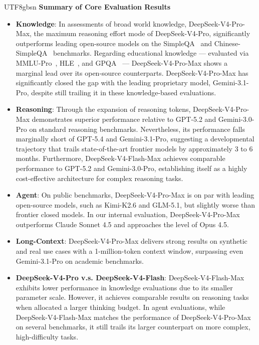 \documentclass[11pt, a4paper, logo, copyright, nonumbering]{deepseek}
\newcommand{\dsvivp}{DeepSeek-V4-Pro}
\newcommand{\dsvivpm}{DeepSeek-V4-Pro-Max}
\newcommand{\dsvivf}{DeepSeek-V4-Flash}
\newcommand{\dsvivfm}{DeepSeek-V4-Flash-Max}
\begin{document}
\begin{CJK*}{UTF8}{gbsn}
\noindent
\textbf{Summary of Core Evaluation Results}
\begin{itemize}[topsep=0pt]
    \item \textbf{Knowledge}:
    In assessments of broad world knowledge, \dsvivpm{}, the maximum reasoning effort mode of \dsvivp{}, significantly outperforms leading open-source models on the SimpleQA~\citep{simpleqa} and Chinese-SimpleQA~\citep{csimpleqa} benchmarks. 
    Regarding educational knowledge --- evaluated via MMLU-Pro~\citep{mmlu_pro}, HLE~\citep{hle}, and GPQA~\citep{gpqa} --- \dsvivpm{} shows a marginal lead over its open-source counterparts. 
    \dsvivpm{} has significantly closed the gap with the leading proprietary model, Gemini-3.1-Pro, despite still trailing it in these knowledge-based evaluations.
    
    \item \textbf{Reasoning}: 
    Through the expansion of reasoning tokens, \dsvivpm{} demonstrates superior performance relative to GPT-5.2 and Gemini-3.0-Pro on standard reasoning benchmarks. 
    Nevertheless, its performance falls marginally short of GPT-5.4 and Gemini-3.1-Pro, suggesting a developmental trajectory that trails state-of-the-art frontier models by approximately 3 to 6 months.
    Furthermore, \dsvivfm{} achieves comparable performance to GPT-5.2 and Gemini-3.0-Pro, establishing itself as a highly cost-effective architecture for complex reasoning tasks.

    \item \textbf{Agent}: 
    On public benchmarks, \dsvivpm{} is on par with leading open-source models, such as Kimi-K2.6 and GLM-5.1, but slightly worse than frontier closed models. 
    In our internal evaluation, \dsvivpm{} outperforms Claude Sonnet 4.5 and approaches the level of Opus 4.5. 

    \item \textbf{Long-Context}: \dsvivpm{} delivers strong results on synthetic and real use cases with a 1-million-token context window, surpassing even Gemini-3.1-Pro on academic benchmarks.

    \item \textbf{\dsvivp{} v.s. \dsvivf{}}: 
    \dsvivfm{} exhibits lower performance in knowledge evaluations due to its smaller parameter scale. 
    However, it achieves comparable results on reasoning tasks when allocated a larger thinking budget. 
    In agent evaluations, while \dsvivfm{} matches the performance of \dsvivpm{} on several benchmarks, it still trails its larger counterpart on more complex, high-difficulty tasks.


\end{itemize}
\end{CJK*}
\end{document}
